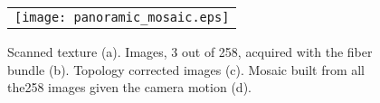 \begin{figure}
\centering
\begin{tabular}{c}
\texttt{[image: panoramic\_mosaic.eps]}  
\end{tabular}
\caption{Scanned texture (a). Images, 3 out of 258, acquired with the fiber bundle (b). Topology corrected images (c). Mosaic built from all the258 images given the camera motion (d).}
\end{figure}
